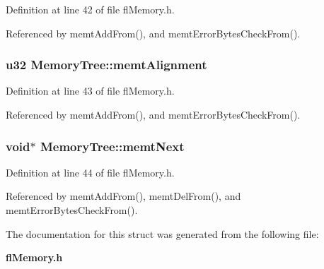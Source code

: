 Definition at line 42 of file fl\-Memory.h.

Referenced by memt\-Add\-From(), and memt\-Error\-Bytes\-Check\-From().
\subsubsection{\setlength{\rightskip}{0pt plus 5cm}u32 {\bf Memory\-Tree::memt\-Alignment}}\label{structMemoryTree_04ea9f24d5b66ac9238564d5b410edd9}




Definition at line 43 of file fl\-Memory.h.

Referenced by memt\-Add\-From(), and memt\-Error\-Bytes\-Check\-From().
\subsubsection{\setlength{\rightskip}{0pt plus 5cm}void$\ast$ {\bf Memory\-Tree::memt\-Next}}\label{structMemoryTree_fc3823a92b76655b60ad168689bab628}




Definition at line 44 of file fl\-Memory.h.

Referenced by memt\-Add\-From(), memt\-Del\-From(), and memt\-Error\-Bytes\-Check\-From().

The documentation for this struct was generated from the following file:\begin{CompactItemize}
\item 
{\bf fl\-Memory.h}\end{CompactItemize}
